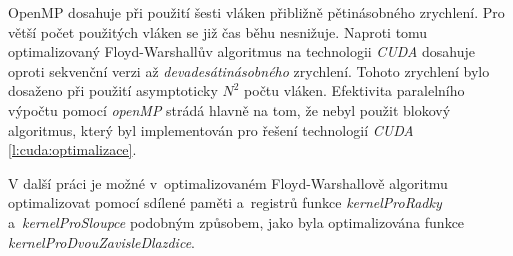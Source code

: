 OpenMP dosahuje při použití šesti vláken přibližně pětinásobného zrychlení. Pro větší počet použitých vláken se již čas běhu nesnižuje.
Naproti tomu optimalizovaný Floyd-Warshallův algoritmus na technologii \emph{CUDA} dosahuje oproti sekvenční verzi až \emph{devadesátinásobného} zrychlení. Tohoto zrychlení bylo dosaženo při použití asymptoticky $N^2$ počtu vláken. Efektivita paralelního výpočtu pomocí \emph{openMP} strádá hlavně na tom, že nebyl použit blokový algoritmus, který byl implementován pro řešení technologií \emph{CUDA} \ref{l:cuda:optimalizace}.

V další práci je možné v~optimalizovaném Floyd-Warshallově algoritmu optimalizovat pomocí sdílené paměti a~registrů funkce \emph{kernelProRadky} a~\emph{kernelProSloupce} podobným způsobem, jako byla optimalizována funkce \emph{kernelProDvouZavisleDlazdice}.


\clearpage





